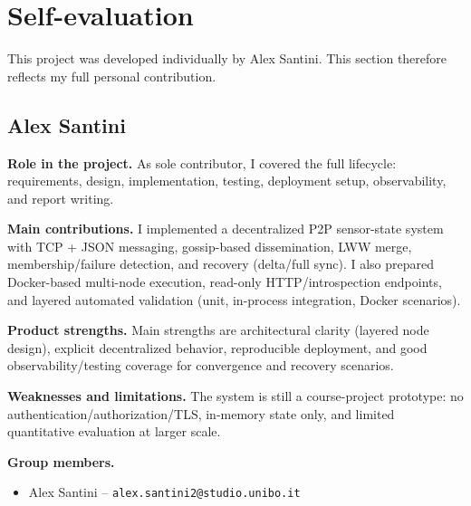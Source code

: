 \section{Self-evaluation}\label{self-evaluation}

This project was developed individually by Alex Santini. This section therefore reflects my full personal contribution.

\subsection{Alex Santini}

\textbf{Role in the project.}
As sole contributor, I covered the full lifecycle: requirements, design, implementation, testing, deployment setup, observability, and report writing.

\textbf{Main contributions.}
I implemented a decentralized P2P sensor-state system with TCP + JSON messaging, gossip-based dissemination, LWW merge, membership/failure detection, and recovery (delta/full sync). I also prepared Docker-based multi-node execution, read-only HTTP/introspection endpoints, and layered automated validation (unit, in-process integration, Docker scenarios).

\textbf{Product strengths.}
Main strengths are architectural clarity (layered node design), explicit decentralized behavior, reproducible deployment, and good observability/testing coverage for convergence and recovery scenarios.

\textbf{Weaknesses and limitations.}
The system is still a course-project prototype: no authentication/authorization/TLS, in-memory state only, and limited quantitative evaluation at larger scale.

\textbf{Group members.}
\begin{itemize}
  \item Alex Santini -- \texttt{alex.santini2@studio.unibo.it}
\end{itemize}

\clearpage
